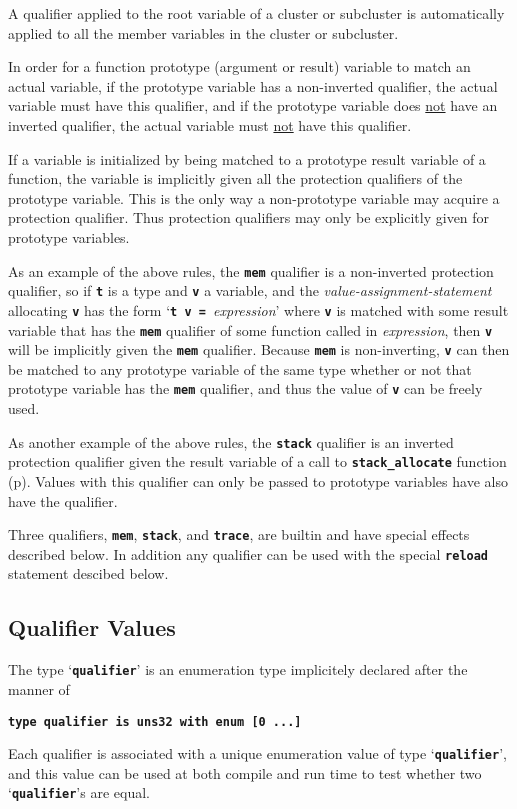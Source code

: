 \documentclass[12pt]{article}
\makeatletter
\newcommand{\TT}[1]{{\tt \bfseries #1}}
\newcommand{\ttkey}[1]{\TT{#1}\index{#1@{\tt #1}}}
\newcommand{\pagref}[1]{p\pageref{#1}}
\makeatother
\begin{document}
A qualifier applied to the root variable of a cluster or subcluster
is automatically applied to all the member variables in the cluster
or subcluster.

In order for a function
prototype (argument or result) variable to match an actual variable,
if the prototype variable has a non-inverted qualifier, the actual
variable must have this qualifier, and if the prototype variable
does \underline{not} have an inverted qualifier, the actual variable
must \underline{not} have this qualifier.

If a variable is initialized by being matched to a prototype result variable
of a function, the variable is implicitly given all the protection qualifiers
of the prototype variable.  This is the only way a non-prototype
variable may acquire
a protection qualifier.  Thus protection qualifiers may only be explicitly
given for prototype variables.

As an example of the above rules, the \TT{mem} qualifier is
a non-inverted protection qualifier, so if \TT{t} is a type and \TT{v} a
variable, and the {\em value-assignment-statement} allocating \TT{v} has the
form `\TT{t v = }{\em expression}' where \TT{v} is matched
with some result variable that has the \TT{mem} qualifier of some
function called in {\em expression}, then \TT{v} will be implicitly
given the \TT{mem} qualifier.  Because \TT{mem} is non-inverting,
\TT{v} can then be matched to any prototype variable of the same type
whether or not that prototype variable has the \TT{mem} qualifier,
and thus the value of \TT{v} can be freely used.

As another example of the above rules, the \TT{stack} qualifier is
an inverted protection qualifier given the result variable of
a call to \TT{stack\_allocate} function (\pagref{STACK-ALLOCATE}).
Values with this qualifier can only be passed to prototype variables
have also have the qualifier.

Three qualifiers, \TT{mem}, \TT{stack},
and \TT{trace}, are builtin and have special
effects described below.
In addition any qualifier can be used with the special \TT{reload} statement
descibed below.

\subsection{Qualifier Values}
\label{QUALIFIER-VALUES}

The type `\ttkey{qualifier}' is an enumeration type implicitely
declared after the manner of
\begin{center}
\TT{type qualifier is uns32 with enum [0 ...]}
\end{center}
Each qualifier is associated with a unique enumeration value
of type `\TT{qualifier}', and this value can be used at both
compile and run time to test whether two `\TT{qualifier}'s are
equal.
\end{document}
